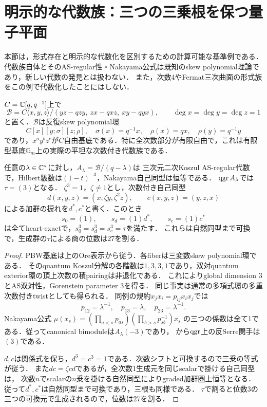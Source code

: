 \section{明示的な代数族：三つの三乗根を保つ量子平面}
\label{sec:quantum-benchmark}
本節は，形式存在と明示的な代数化を区別するための計算可能な基準例である．
代数族自体とそのAS-regular性・Nakayama公式は既知のskew polynomial理論であり，新しい代数の発見とは扱わない．
また，次数4やFermat三次曲面の形式族をこの例で代数化したことにはしない．

$C=\mathbb C[q,q^{-1}]$上で
\begin{equation}\label{eq:quantum-family}
 \mathcal B=C\langle x,y,z\rangle/(yz-qzy,\ zx-qxz,\ xy-qyx),
 \qquad\deg x=\deg y=\deg z=1
\end{equation}
と置く．$\mathcal B$は反復skew polynomial環
\[
 C[x][y;\sigma][z;\rho],\quad
 \sigma(x)=q^{-1}x,\quad\rho(x)=qx,\quad\rho(y)=q^{-1}y
\]
であり，$x^ay^bz^c$が$C$自由基底である．特に全次数部分が有限自由で，これは有限型基底$\mathbb G_m$上の実際の平坦な次数付き代数族である．

\begin{proposition}[複数根を持つ代数的な基準族]\label{prop:quantum-three-roots}
任意の$\lambda\in\mathbb C^*$に対し，$A_\lambda=\mathcal B/(q-\lambda)$は
三次元二次Koszul AS-regular代数で，Hilbert級数は$(1-t)^{-3}$，Nakayama自己同型は恒等である．
$\operatorname{qgr} A_\lambda$では$\tau=(3)$となる．
$\zeta^3=1$，$\zeta\ne1$とし，次数付き自己同型
\[
 d(x,y,z)=(x,\zeta y,\zeta^2z),\qquad c(x,y,z)=(y,z,x)
\]
による加群の捩れを$d^*,c^*$と書く．このとき
\[
 s_0=(1),\qquad s_d=(1)d^*,\qquad s_c=(1)c^*
\]
は全てheart-exactで，$s_0^3=s_d^3=s_c^3=\tau$を満たす．
これらは自然同型まで可換で，生成群の$\tau$による商の位数は27を割る．
\end{proposition}
\begin{proof}
PBW基底は上のOre表示から従う．各fiberは三変数skew polynomial環である．
そのquantum Koszul分解の各階数は$1,3,3,1$であり，双対quantum exterior環の頂上次数の積pairingは非退化である．
これによりglobal dimension 3とAS双対性，Gorenstein parameter 3を得る．
同じ事実は通常の多項式環の多重次数付きtwistとしても得られる\cite[Example 5.5]{RRZ}．
同例の規約$x_jx_i=p_{ij}x_ix_j$では
\[
 p_{12}=\lambda^{-1},\quad p_{13}=\lambda,\quad p_{23}=\lambda^{-1}.
\]
Nakayama公式
$\mu(x_s)=(\prod_{a<s}p_{as})(\prod_{b>s}p_{sb}^{-1})x_s$
の三つの係数は全て1である．従ってcanonical bimoduleは$A_\lambda(-3)$であり，
\cite[Definition 1.3, Example 3.6]{MU}から$\operatorname{qgr}$上の反Serre関手は$(3)$である．

$d,c$は関係式を保ち，$d^3=c^3=1$である．次数シフトと可換するので三乗の等式が従う．
また$dc=\zeta cd$であるが，全次数1生成元を同じscalarで掛ける自己同型は，
次数$n$でscalarの$n$乗を掛ける自然同型によりgraded加群圏上恒等となる．
従って$d^*,c^*$は自然同型まで可換であり，三根も同様である．
$\tau$で割ると位数3の三つの可換元で生成されるので，位数は27を割る．
\end{proof}


